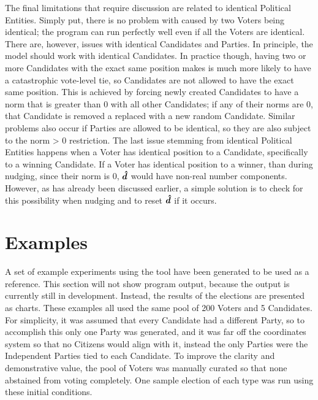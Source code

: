 \documentclass[12pt]{article}
\begin{document}
\qquad The final limitations that require discussion are related to identical Political Entities. Simply put, there is no problem with caused by two Voters being identical; the program can run perfectly well even if all the Voters are identical. There are, however, issues with identical Candidates and Parties. In principle, the model should work with identical Candidates. In practice though, having two or more Candidates with the exact same position makes is much more likely to have a catastrophic vote-level tie, so Candidates are not allowed to have the exact same position. This is achieved by forcing newly created Candidates to have a norm that is greater than 0 with all other Candidates; if any of their norms are 0, that Candidate is removed a replaced with a new random Candidate. Similar problems also occur if Parties are allowed to be identical, so they are also subject to the norm > 0 restriction. The last issue stemming from identical Political Entities happens when a Voter has identical position to a Candidate, specifically to a winning Candidate. If a Voter has identical position to a winner, than during nudging, since their norm is 0, $\bm{\hat{d}}$ would have non-real number components. However, as has already been discussed earlier, a simple solution is to check for this possibility when nudging and to reset $\bm{\hat{d}}$ if it occurs. \\

\section{Examples} \label{Examples}

\qquad A set of example experiments using the tool have been generated to be used as a reference. This section will not show program output, because the output is currently still in development. Instead, the results of the elections are presented as charts. These examples all used the same pool of 200 Voters and 5 Candidates. For simplicity, it was assumed that every Candidate had a different Party, so to accomplish this only one Party was generated, and it was far off the coordinates system so that no Citizens would align with it, instead the only Parties were the Independent Parties tied to each Candidate. To improve the clarity and demonstrative value, the pool of Voters was manually curated so that none abstained from voting completely. One sample election of each type was run using these initial conditions.\\
\end{document}
